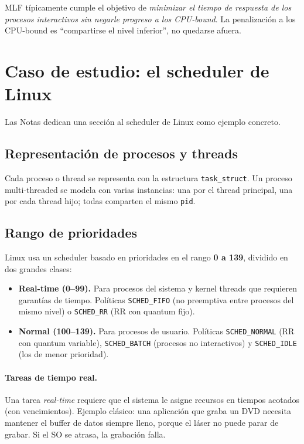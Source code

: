 \documentclass[11pt,a4paper]{article}
\begin{document}
MLF típicamente cumple el objetivo de \emph{minimizar el tiempo de
respuesta de los procesos interactivos sin negarle progreso a los
CPU-bound}. La penalización a los CPU-bound es ``compartirse el nivel
inferior'', no quedarse afuera.

\section{Caso de estudio: el scheduler de Linux}

Las Notas dedican una sección al scheduler de Linux como ejemplo
concreto.

\subsection{Representación de procesos y threads}

Cada proceso o thread se representa con la estructura
\texttt{task\_struct}. Un proceso multi-threaded se modela con varias
instancias: una por el thread principal, una por cada thread hijo;
todas comparten el mismo \texttt{pid}.

\subsection{Rango de prioridades}

Linux usa un scheduler basado en prioridades en el rango \textbf{0 a
139}, dividido en dos grandes clases:

\begin{itemize}[leftmargin=*]
    \item \textbf{Real-time (0--99).} Para procesos del sistema y
        kernel threads que requieren garantías de tiempo. Políticas
        \texttt{SCHED\_FIFO} (no preemptiva entre procesos del mismo
        nivel) o \texttt{SCHED\_RR} (RR con quantum fijo).
    \item \textbf{Normal (100--139).} Para procesos de usuario.
        Políticas \texttt{SCHED\_NORMAL} (RR con quantum variable),
        \texttt{SCHED\_BATCH} (procesos no interactivos) y
        \texttt{SCHED\_IDLE} (los de menor prioridad).
\end{itemize}

\paragraph{Tareas de tiempo real.} Una tarea \emph{real-time} requiere
que el sistema le asigne recursos en tiempos acotados (con
vencimientos). Ejemplo clásico: una aplicación que graba un DVD
necesita mantener el buffer de datos siempre lleno, porque el láser
no puede parar de grabar. Si el SO se atrasa, la grabación falla.
\end{document}
